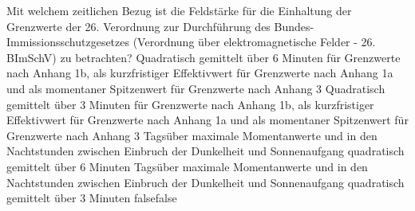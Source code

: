     {Mit welchem zeitlichen Bezug ist die Feldstärke für die Einhaltung der Grenzwerte der 26. Verordnung zur Durchführung des Bundes-Immissionsschutzgesetzes (Verordnung über elektromagnetische Felder - 26. BImSchV) zu betrachten?}
    {Quadratisch gemittelt über 6 Minuten für Grenzwerte nach Anhang 1b, als kurzfristiger Effektivwert für Grenzwerte nach Anhang 1a und als momentaner Spitzenwert für Grenzwerte nach Anhang 3}
    {Quadratisch gemittelt über 3 Minuten für Grenzwerte nach Anhang 1b, als kurzfristiger Effektivwert für Grenzwerte nach Anhang 1a und als momentaner Spitzenwert für Grenzwerte nach Anhang 3}
    {Tagsüber maximale Momentanwerte und in den Nachtstunden zwischen Einbruch der Dunkelheit und Sonnenaufgang quadratisch gemittelt über 6 Minuten}
    {Tagsüber maximale Momentanwerte und in den Nachtstunden zwischen Einbruch der Dunkelheit und Sonnenaufgang quadratisch gemittelt über 3 Minuten}
    {false}{false}